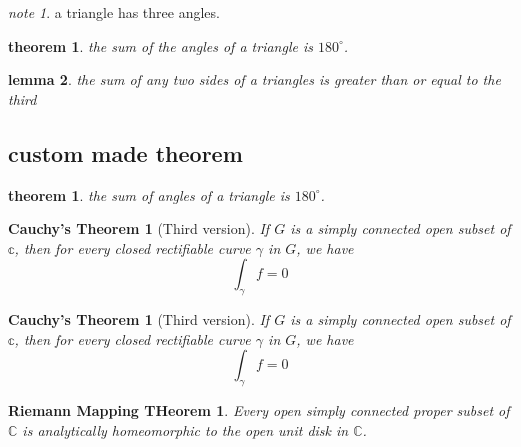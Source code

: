 \documentclass[a4paper, UTF8]{article}
\newtheorem{thm}{theorem}[section]
\theoremstyle{definition}
\theoremstyle{remark}
\newtheorem{note}{note}[section]
\theoremstyle{plain}
\newtheorem{lem}[thm]{lemma}
\begin{document}
\begin{note}
    a triangle has three angles.
\end{note}

\begin{thm}
    the sum of the angles of a triangle is $180^\circ$.
\end{thm}

\begin{lem}
    the sum of any two sides of a triangles is greater than or equal to the third
\end{lem}

\subsection{custom made theorem}
\theoremstyle{rjpstyle}
\newtheorem{rrr}{theorem}[section]
\theoremstyle{plain}
\begin{rrr}
    the sum of angles of a triangle is $180^\circ$.
\end{rrr}

\theoremstyle{nonum1}
\newtheorem{cau1}{Cauchy's Theorem}

\begin{cau1}[Third version]
    If $G$ is a simply connected open subset of $\mathbb{c}$, then for every closed rectifiable curve $\gamma$ in $G$, we have
    \begin{equation*}
        \int_{\gamma}f=0
    \end{equation*}
\end{cau1}

\theoremstyle{nonum2}
\newtheorem{cau2}{Cauchy's Theorem}
\begin{cau2}[Third version]
    If $G$ is a simply connected open subset of $\mathbb{c}$, then for every closed rectifiable curve $\gamma$ in $G$, we have
    \begin{equation*}
        \int_{\gamma}f=0
    \end{equation*}
\end{cau2}

\theoremstyle{nonum1}
\newtheorem{Riemann}{Riemann Mapping THeorem} 
\begin{Riemann}
    Every open simply connected proper subset of $\mathbb{C}$ is analytically homeomorphic to the open unit disk in $\mathbb{C}$.
\end{Riemann}
\end{document}
